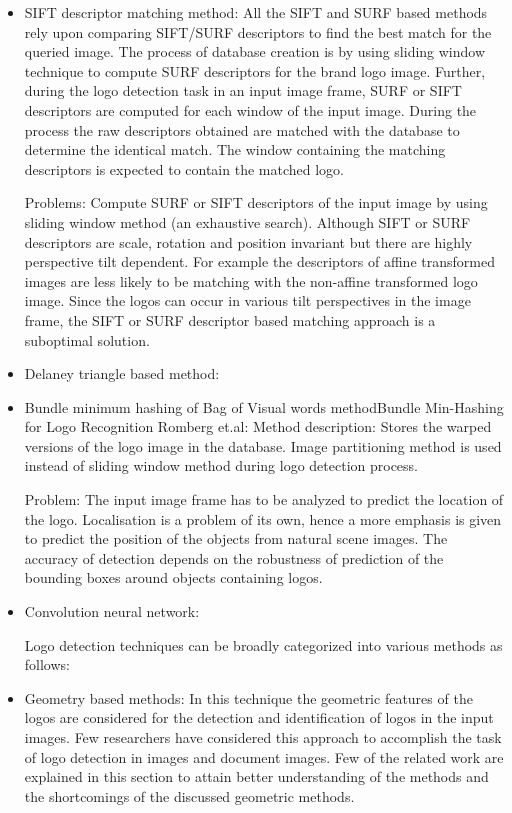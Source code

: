 \begin{itemize}
 
 \item SIFT descriptor matching method: All the SIFT and SURF based methods rely upon comparing SIFT/SURF descriptors to find the best match for the queried image. The process of database creation is by using sliding window technique to compute SURF descriptors for the brand logo image. Further, during the logo detection task in an input image frame, SURF or SIFT descriptors are computed for each window of the input image. During the process the raw descriptors obtained are matched with the database to determine the identical match. The window containing the matching descriptors is expected to contain the matched logo. 
      
 Problems: Compute SURF or SIFT descriptors of the input image by using sliding window method (an exhaustive search). Although SIFT or SURF descriptors are scale, rotation and position invariant but there are highly perspective tilt dependent. For example the descriptors of affine transformed images are less likely to be matching with the non-affine transformed logo image. Since the logos can occur in various tilt perspectives in the image frame, the SIFT or SURF descriptor based matching approach is a suboptimal solution.
   
 \item Delaney triangle based method:
 
 \item Bundle minimum hashing of Bag of Visual words method{Bundle Min-Hashing for Logo Recognition Romberg et.al}: 
 Method description: Stores the warped versions of the logo image in the database. Image partitioning method is used instead of sliding window method during logo detection process. 
 
 Problem: The input image frame has to be analyzed to predict the location of the logo. Localisation is a problem of its own, hence a more emphasis is given to predict the position of the objects from natural scene images. The accuracy of detection depends on the robustness of prediction of the bounding boxes around objects containing logos. 

 \item Convolution neural network:
 
 Logo detection techniques can be broadly categorized into various methods as follows:
 
 \item Geometry based methods: In this technique the geometric features of the logos are considered for the detection and identification of logos in the input images. Few researchers have considered this approach to accomplish the task of logo detection in images and document images. Few of the related work are explained in this section to attain better understanding of the methods and the shortcomings of the discussed geometric methods. 
 

\end{itemize}
